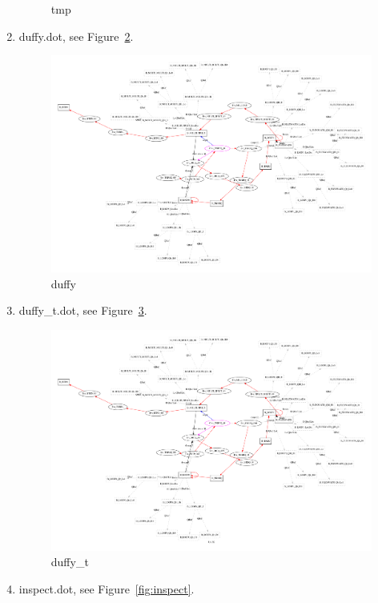 \documentclass[12pt,a4paper]{report}
\begin{document}
\begin{enumerate}
\begin{figure}
        \caption{tmp}
        \label{fig:tmp}
    \end{figure}
\item duffy.dot, see Figure~\ref{fig:duffy}.
    \begin{figure}
        \centering 
        \includegraphics*[width=1.0\textwidth,keepaspectratio]{TestPattern/duffy.pdf}
        \caption{duffy}
        \label{fig:duffy}
    \end{figure}
\item duffy\_t.dot, see Figure~\ref{fig:duffy_t}.
    \begin{figure}
        \centering 
        \includegraphics*[width=1.0\textwidth,keepaspectratio]{TestPattern/duffy_t.pdf}
        \caption{duffy\_t}
        \label{fig:duffy_t}
    \end{figure}
\item inspect.dot, see Figure~\ref{fig:inspect}.

\end{enumerate}
\end{document}

